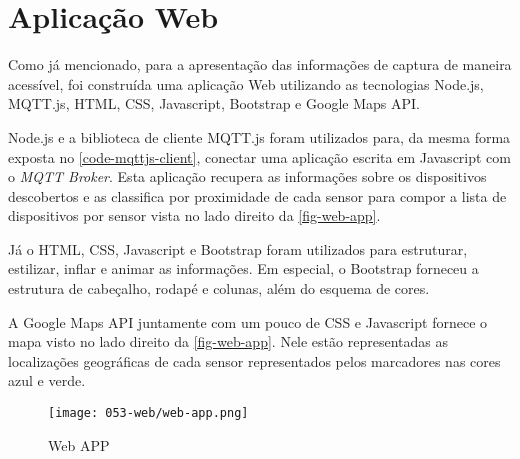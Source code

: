 \section{Aplicação Web}
\label{sec:app-web}

Como já mencionado, para a apresentação das informações de captura de maneira
acessível, foi construída uma aplicação Web utilizando as tecnologias
Node.js, MQTT.js, HTML, CSS, Javascript,
Bootstrap e Google Maps API.

Node.js e a biblioteca de cliente MQTT.js foram utilizados para,
da mesma forma exposta no \autoref{code-mqttjs-client}, conectar
uma aplicação escrita em Javascript com o \emph{MQTT Broker}. Esta
aplicação recupera as informações sobre os dispositivos descobertos e as
classifica por proximidade de cada sensor para compor a lista de dispositivos
por sensor vista no lado direito da \autoref{fig-web-app}.

Já o HTML, CSS, Javascript e Bootstrap foram
utilizados para estruturar, estilizar, inflar e animar as informações. Em
especial, o Bootstrap forneceu a estrutura de cabeçalho, rodapé e colunas,
além do esquema de cores.

A Google Maps API juntamente com um pouco de CSS e
Javascript fornece o mapa visto no lado direito da \autoref{fig-web-app}.
Nele estão representadas as localizações geográficas de cada sensor
representados pelos marcadores nas cores azul e verde.

\begin{figure}[htb]
	\caption{\label{fig-web-app}Web APP}
	\begin{center}
		\texttt{[image: 053-web/web-app.png]}
	\end{center}
\end{figure}
